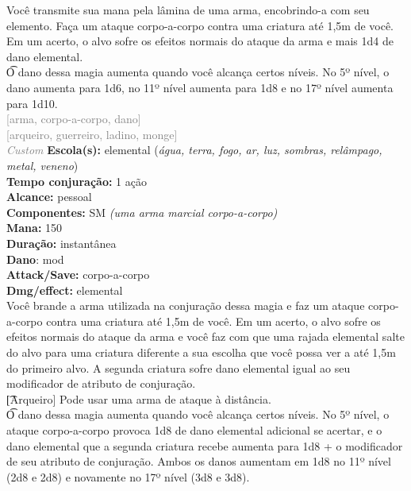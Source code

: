 \documentclass{RPG_Adventure}[2021/10/20]
\begin{document}
{\normalsize Você transmite sua mana pela lâmina de uma arma, encobrindo-a com seu elemento. Faça um ataque corpo-a-corpo contra uma criatura até 1,5m de você. Em um acerto, o alvo sofre os efeitos normais do ataque da arma e mais 1d4 de dano elemental.\\\t O dano dessa magia aumenta quando você alcança certos níveis. No 5º nível, o dano aumenta para 1d6, no 11º nível aumenta para 1d8 e no 17º nível aumenta para 1d10.\\}
{\scriptsize \textcolor{gray}{[arma, corpo-a-corpo, dano]\\}}
{\scriptsize \textcolor{gray}{[arqueiro, guerreiro, ladino, monge]\\}}
{\tiny \textcolor{gray}{\textit{Custom}}}\jump{}
{\small \t \textbf{Escola(s):} elemental (\textit{água, terra, fogo, ar, luz, sombras, relâmpago, metal, veneno})\\\t \textbf{Tempo conjuração:} 1 ação\\\t \textbf{Alcance:} pessoal\\\t \textbf{Componentes:} SM \textit{(uma arma marcial corpo-a-corpo)}\\\t \textbf{Mana:} 150\\\t \textbf{Duração:} instantânea\\\t \textbf{Dano}: mod\\\t \textbf{Attack/Save:} corpo-a-corpo\\\t \textbf{Dmg/effect:} elemental\\}
{\normalsize Você brande a arma utilizada na conjuração dessa magia e faz um ataque corpo-a-corpo contra uma criatura até 1,5m de você. Em um acerto, o alvo sofre os efeitos normais do ataque da arma e você faz com que uma rajada elemental salte do alvo para uma criatura diferente a sua escolha que você possa ver a até 1,5m do primeiro alvo. A segunda criatura sofre dano elemental igual ao seu modificador de atributo de conjuração.\\\t [Arqueiro] Pode usar uma arma de ataque à distância.\\\t O dano dessa magia aumenta quando você alcança certos níveis. No 5º nível, o ataque corpo-a-corpo provoca 1d8 de dano elemental adicional se acertar, e o dano elemental que a segunda criatura recebe aumenta para 1d8 + o modificador de seu atributo de conjuração. Ambos os danos aumentam em 1d8 no 11º nível (2d8 e 2d8) e novamente no 17º nível (3d8 e 3d8).\\}
\end{document}
